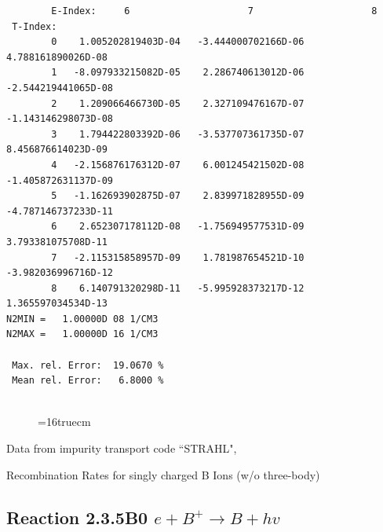 \documentclass[12pt,dvipdfmx]{article}
\begin{document}
\begin{small}
\begin{verbatim}
        E-Index:     6                     7                     8
 T-Index:
        0    1.005202819403D-04   -3.444000702166D-06    4.788161890026D-08
        1   -8.097933215082D-05    2.286740613012D-06   -2.544219441065D-08
        2    1.209066466730D-05    2.327109476167D-07   -1.143146298073D-08
        3    1.794422803392D-06   -3.537707361735D-07    8.456876614023D-09
        4   -2.156876176312D-07    6.001245421502D-08   -1.405872631137D-09
        5   -1.162693902875D-07    2.839971828955D-09   -4.787146737233D-11
        6    2.652307178112D-08   -1.756949577531D-09    3.793381075708D-11
        7   -2.115315858957D-09    1.781987654521D-10   -3.982036996716D-12
        8    6.140791320298D-11   -5.995928373217D-12    1.365597034534D-13
N2MIN =   1.00000D 08 1/CM3
N2MAX =   1.00000D 16 1/CM3

 Max. rel. Error:  19.0670 %
 Mean rel. Error:   6.8000 %


\end{verbatim}\end{small}
\begin{figure} \label{2.3.4B1}
\epsfxsize=16truecm
\end{figure}
\newpage
Data from impurity transport code ``STRAHL", \cite{kn:Behringer}

  Recombination Rates for singly charged B Ions (w/o three-body)
\subsection{
Reaction 2.3.5B0 $ e + B^+ \rightarrow B + hv $
}
\end{document}
